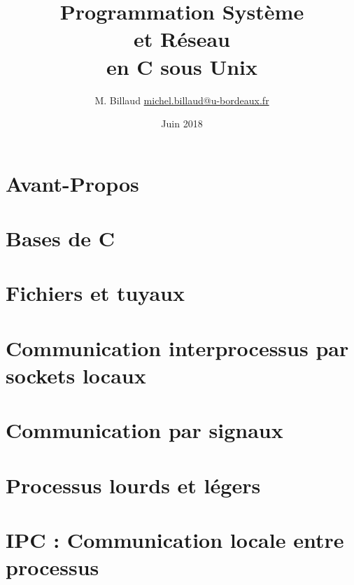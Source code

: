 \documentclass[10pt, a4paper, twoside, openright]{extreport}
\title{
  Programmation Système \\
  et Réseau \\ en C sous Unix
}
\author{M. Billaud \url{michel.billaud@u-bordeaux.fr}}
\date{Juin 2018}
\begin{document}
 
\maketitle






\chapter*{Avant-Propos}



\tableofcontents



\chapter{Bases de C}



\chapter{Fichiers et tuyaux}





\chapter{Communication interprocessus par sockets locaux}



\chapter{Communication par signaux}



\chapter{Processus lourds et légers}



\chapter{IPC : Communication locale entre processus}
\end{document}
